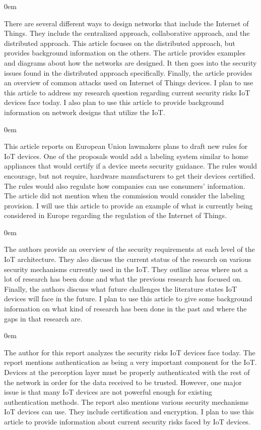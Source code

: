 \documentclass{article}
\newenvironment{annotation}{\begin{addmargin}[2.5em]{0em} \begin{flushleft}}{\end{flushleft} \end{addmargin}}
\begin{document}
\begin{annotation}
There are several different ways to design networks that include the Internet of Things. They include the centralized approach, collaborative approach, and the distributed approach. This article focuses on the
distributed approach, but provides background information on the others. The article provides examples and diagrams about how the networks are designed. It then goes into the security issues found in the distributed
approach specifically. Finally, the article provides an overview of common attacks used on Internet of Things devices. I plan to use this article to address my research question regarding current security
risks IoT devices face today. I also plan to use this article to provide background information on network designs that utilize the IoT. 
\end{annotation}

\newpage
{}
\begin{annotation}
This article reports on European Union lawmakers plans to draft new rules for IoT devices. One of the proposals would add a labeling system similar to home appliances that would
certify if a device meets security guidance. The rules would encourage, but not require, hardware manufacturers to get their devices certified. The rules would also regulate how companies 
can use consumers' information. The article did not mention when the commission would consider the labeling provision. I will use this article to provide an example of what is currently being considered in Europe regarding the regulation of the Internet of Things. 
\end{annotation}

\begin{annotation}
The authors provide an overview of the security requirements at each level of the IoT architecture. They also discuss the current status of the research on various security mechanisms currently used
in the IoT. They outline areas where not a lot of research has been done and what the previous research has focused on. Finally, the authors discuss what future challenges the literature states
IoT devices will face in the future. I plan to use this article to give some background information on what kind of research has been done in the past and where the gaps in that research are. 
\end{annotation}

\begin{annotation}
The author for this report analyzes the security risks IoT devices face today. The report mentions authentication as being a very important component for the IoT. Devices at the perception layer must be
properly authenticated with the rest of the network in order for the data received to be trusted. However, one major issue is that many IoT devices are not powerful enough for existing authentication methods.
The report also mentions various security mechanisms IoT devices can use. They include certification and encryption. I plan to use this article to provide information about current security risks
faced by IoT devices.
\end{annotation}
\end{document}
